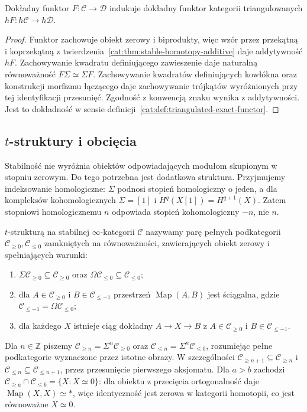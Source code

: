 \begin{wniosek}\label{cat:cor:stable-triangulated-functor}
Dokładny funktor $F:\mathcal C\to\mathcal D$ indukuje dokładny funktor kategorii triangulowanych $hF:h\mathcal C\to h\mathcal D$.
\end{wniosek}
\begin{proof}
Funktor zachowuje obiekt zerowy i biprodukty, więc wzór przez przekątną i koprzekątną z twierdzenia~\ref{cat:thm:stable-homotopy-additive} daje addytywność $hF$. Zachowywanie kwadratu definiującego zawieszenie daje naturalną równoważność $F\Sigma\simeq\Sigma F$. Zachowywanie kwadratów definiujących kowłókna oraz konstrukcji morfizmu łączącego daje zachowywanie trójkątów wyróżnionych przy tej identyfikacji przesunięć. Zgodność z konwencją znaku wynika z addytywności. Jest to dokładność w sensie definicji~\ref{cat:def:triangulated-exact-functor}.
\end{proof}

\subsection{\texorpdfstring{$t$}{t}-struktury i obcięcia}

Stabilność nie wyróżnia obiektów odpowiadających modułom skupionym w stopniu zerowym. Do tego potrzebna jest dodatkowa struktura. Przyjmujemy indeksowanie homologiczne: $\Sigma$ podnosi stopień homologiczny o jeden, a dla kompleksów kohomologicznych $\Sigma=[1]$ i $H^q(X[1])=H^{q+1}(X)$. Zatem stopniowi homologicznemu $n$ odpowiada stopień kohomologiczny $-n$, nie $n$.

\begin{definicja}[$t$-struktura]\label{cat:def:stable-t-structure}
$t$-strukturą na stabilnej $\infty$-kategorii $\mathcal C$ nazywamy parę pełnych podkategorii $\mathcal C_{\geq0},\mathcal C_{\leq0}$ zamkniętych na równoważności, zawierających obiekt zerowy i spełniających warunki:
\begin{enumerate}
 \item $\Sigma\mathcal C_{\geq0}\subseteq\mathcal C_{\geq0}$ oraz $\Omega\mathcal C_{\leq0}\subseteq\mathcal C_{\leq0}$;
 \item dla $A\in\mathcal C_{\geq0}$ i $B\in\mathcal C_{\leq-1}$ przestrzeń $\operatorname{Map}(A,B)$ jest ściągalna, gdzie $\mathcal C_{\leq-1}=\Omega\mathcal C_{\leq0}$;
 \item dla każdego $X$ istnieje ciąg dokładny $A\to X\to B$ z $A\in\mathcal C_{\geq0}$ i $B\in\mathcal C_{\leq-1}$.
\end{enumerate}
Dla $n\in\mathbb Z$ piszemy $\mathcal C_{\geq n}=\Sigma^n\mathcal C_{\geq0}$ oraz $\mathcal C_{\leq n}=\Sigma^n\mathcal C_{\leq0}$, rozumiejąc pełne podkategorie wyznaczone przez istotne obrazy. W szczególności $\mathcal C_{\geq n+1}\subseteq\mathcal C_{\geq n}$ i $\mathcal C_{\leq n}\subseteq\mathcal C_{\leq n+1}$, przez przesunięcie pierwszego aksjomatu. Dla $a>b$ zachodzi $\mathcal C_{\geq a}\cap\mathcal C_{\leq b}=\{X:X\simeq0\}$: dla obiektu z przecięcia ortogonalność daje $\operatorname{Map}(X,X)\simeq *$, więc identyczność jest zerowa w kategorii homotopii, co jest równoważne $X\simeq0$.
\end{definicja}

